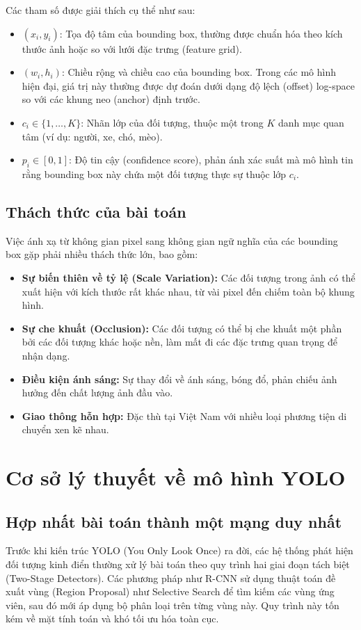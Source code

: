 Các tham số được giải thích cụ thể như sau:
\begin{itemize}
    \item $(x_i, y_i)$: Tọa độ tâm của bounding box, thường được chuẩn hóa theo kích thước ảnh hoặc so với lưới đặc trưng (feature grid).
    \item $(w_i, h_i)$: Chiều rộng và chiều cao của bounding box. Trong các mô hình hiện đại, giá trị này thường được dự đoán dưới dạng độ lệch (offset) log-space so với các khung neo (anchor) định trước.
    \item $c_i \in \{1, \dots, K\}$: Nhãn lớp của đối tượng, thuộc một trong $K$ danh mục quan tâm (ví dụ: người, xe, chó, mèo).
    \item $p_i \in [0, 1]$: Độ tin cậy (confidence score), phản ánh xác suất mà mô hình tin rằng bounding box này chứa một đối tượng thực sự thuộc lớp $c_i$.
\end{itemize}

\subsection{Thách thức của bài toán}
Việc ánh xạ từ không gian pixel sang không gian ngữ nghĩa của các bounding box gặp phải nhiều thách thức lớn, bao gồm:
\begin{itemize}
    \item \textbf{Sự biến thiên về tỷ lệ (Scale Variation):} Các đối tượng trong ảnh có thể xuất hiện với kích thước rất khác nhau, từ vài pixel đến chiếm toàn bộ khung hình.
    \item \textbf{Sự che khuất (Occlusion):} Các đối tượng có thể bị che khuất một phần bởi các đối tượng khác hoặc nền, làm mất đi các đặc trưng quan trọng để nhận dạng.
    \item \textbf{Điều kiện ánh sáng:} Sự thay đổi về ánh sáng, bóng đổ, phản chiếu ảnh hưởng đến chất lượng ảnh đầu vào.
    \item \textbf{Giao thông hỗn hợp:} Đặc thù tại Việt Nam với nhiều loại phương tiện di chuyển xen kẽ nhau.
\end{itemize}


\section{Cơ sở lý thuyết về mô hình YOLO}

\subsection{Hợp nhất bài toán thành một mạng duy nhất}
Trước khi kiến trúc YOLO (You Only Look Once) ra đời, các hệ thống phát hiện đối tượng kinh điển thường xử lý bài toán theo quy trình hai giai đoạn tách biệt (Two-Stage Detectors). Các phương pháp như R-CNN sử dụng thuật toán đề xuất vùng (Region Proposal) như Selective Search để tìm kiếm các vùng ứng viên, sau đó mới áp dụng bộ phân loại trên từng vùng này. Quy trình này tốn kém về mặt tính toán và khó tối ưu hóa toàn cục.

